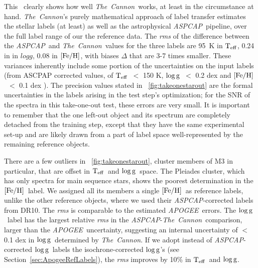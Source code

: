 \documentclass[12pt, preprint]{aastex}
\newcommand{\sectionname}{Section}
\newcommand{\tc}{\textsl{The~Cannon}}
\newcommand{\apogee}{\textsl{APOGEE}}
\newcommand{\aspcap}{\textsl{ASPCAP}}
\newcommand{\teff}{\mbox{$\rm T_{eff}$}}
\newcommand{\feh}{\mbox{$\rm [Fe/H]$}}
\newcommand{\logg}{\mbox{$\rm \log g$}}
\begin{document}
This \figurename\ clearly shows how well \tc\ works, at least in the circumstance at hand.
\tc 's purely mathematical approach of label transfer estimates the stellar labels (at least) as well as the astrophysical \aspcap\ pipeline,
over the full label range of our the reference data. The \textit{rms} of the difference between the \aspcap\ and \tc\ values for the three labels are
95~K in $\teff$, 0.24 in in $logg$, 0.08 in $\feh$, with biases $\Delta$ that are 3-7 times smaller.  
These variances inherently include some portion of the uncertainties on the input labels (from ASCPAP corrected values, 
of \teff\ $<$ 150 K, \logg\ $<$ 0.2 dex and \feh\ $<$ 0.1 dex \citep{Meszaros2013}).
The precision values stated in \figurename~\ref{fig:takeonestarout} are the formal uncertainties in the labels arising 
in the test step's optimization; for the SNR of the spectra in this take-one-out test, these errors are very small.
It is important to remember that the one left-out object and its spectrum are completely detached from the training step, 
except that they have the same experimental set-up and are likely drawn from a part of label space well-represented by the remaining reference objects.

There are a few outliers in \figurename~\ref{fig:takeonestarout}, cluster members of M3 in particular, that are offset in \teff\ and \logg\ space. 
The Pleiades cluster, which has only spectra for main sequence stars, shows the poorest determination in the \feh\ label. We assigned all its members a single \feh ~as reference labels, unlike the other reference objects, where we used their \aspcap -corrected labels from DR10.
The \textit{rms} is comparable to the estimated \apogee\ errors. The \logg\ label has the largest relative \textit{rms} in the \aspcap\--\tc\ comparison, larger than the \apogee\ uncertainty, suggesting an internal uncertainty of $<$ 0.1 dex in \logg\ determined by \tc.
If we adopt instead of \aspcap -corrected \logg\ labels the isochrone-corrected \logg 's (see \sectionname~\ref{sec:ApogeeRefLabels}), the \textit{rms} improves by 10\% in \teff\ and \logg.
\end{document}

